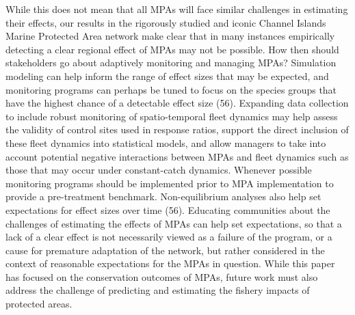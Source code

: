 \documentclass[9pt,twocolumn,twoside,lineno]{pnas-new}
\begin{document}
While this does not mean that all MPAs will face similar challenges in
estimating their effects, our results in the rigorously studied and
iconic Channel Islands Marine Protected Area network make clear that in
many instances empirically detecting a clear regional effect of MPAs may
not be possible. How then should stakeholders go about adaptively
monitoring and managing MPAs? Simulation modeling can help inform the
range of effect sizes that may be expected, and monitoring programs can
perhaps be tuned to focus on the species groups that have the highest
chance of a detectable effect size (56). Expanding data collection to
include robust monitoring of spatio-temporal fleet dynamics may help
assess the validity of control sites used in response ratios, support
the direct inclusion of these fleet dynamics into statistical models,
and allow managers to take into account potential negative interactions
between MPAs and fleet dynamics such as those that may occur under
constant-catch dynamics. Whenever possible monitoring programs should be
implemented prior to MPA implementation to provide a pre-treatment
benchmark. Non-equilibrium analyses also help set expectations for
effect sizes over time (56). Educating communities about the challenges
of estimating the effects of MPAs can help set expectations, so that a
lack of a clear effect is not necessarily viewed as a failure of the
program, or a cause for premature adaptation of the network, but rather
considered in the context of reasonable expectations for the MPAs in
question. While this paper has focused on the conservation outcomes of
MPAs, future work must also address the challenge of predicting and
estimating the fishery impacts of protected areas.
\end{document}

